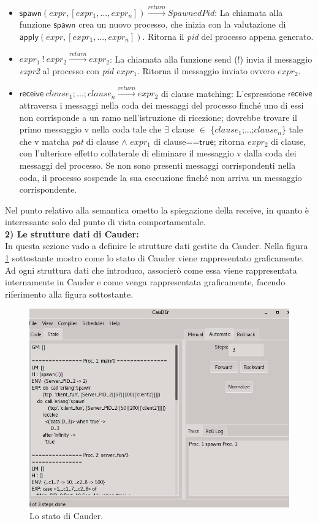 \documentclass[background.tex]{subfiles}
\begin{document}
\begin{itemize}
	\item $\displaystyle \mathsf{spawn}(expr,[expr_{1},...,expr_{n}])\xrightarrow{return}SpawnedPid$: La chiamata alla funzione $\mathsf{spawn}$ crea un nuovo processo, che inizia con la valutazione di $\displaystyle \mathsf{apply}(expr,[expr_{1},...,expr_{n}])$. Ritorna il \textit{pid} del processo appena generato.
	\item $\displaystyle expr_{1}~!~expr_{2}\xrightarrow{return}expr_{2}$: La chiamata alla funzione send (!) invia il messaggio \textit{expr2} al processo con \textit{pid $expr_{1}$}. Ritorna il messaggio inviato ovvero \textit{$expr_{2}$}.
	\item $\displaystyle \mathsf{receive}~clause_{1};...;clause_{n}\xrightarrow{return}expr_{2}$ di clause matching: L'espressione $\mathsf{receive}$ attraversa i messaggi nella coda dei messaggi del processo finché uno di essi non corrisponde a un ramo nell'istruzione di ricezione; dovrebbe trovare il primo messaggio v nella coda tale che $\exists$ clause $\in$ \{$clause_{1}$;...;$clause_{n}$\} tale che v matcha \textit{pat} di clause $\wedge$ \textit{$expr_{1}$} di clause==$\mathsf{true}$; ritorna \textit{$expr_{2}$} di clause, con l'ulteriore effetto collaterale di eliminare il messaggio v dalla coda dei messaggi del processo. Se non sono presenti messaggi corrispondenti nella coda, il processo sospende la sua esecuzione finché non arriva un messaggio corrispondente.
\end{itemize}
Nel punto relativo alla semantica ometto la spiegazione della receive, in quanto è interessante solo dal punto di vista comportamentale.\\
\textbf{2) Le strutture dati di Cauder:}\\
In questa sezione vado a definire le strutture dati gestite da Cauder.
Nella figura \ref{fig3} sottostante mostro come lo stato di Cauder viene rappresentato graficamente.
Ad ogni struttura dati che introduco, associerò come essa viene rappresentata internamente in Cauder e come venga rappresentata graficamente, facendo riferimento alla figura sottostante.
\begin{figure}[!ht]
	\centerline{\includegraphics[scale=0.5]{./Background/Cauder/Imgs/CauderStato}}
	\caption{Lo stato di Cauder.}
	\label{fig3}
\end{figure}
\end{document}
